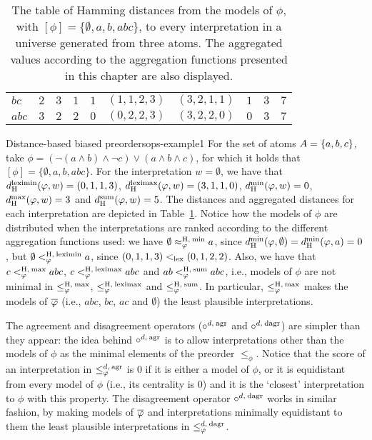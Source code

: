 \begin{table}
\begin{tabular}{lccccccccc}
	$bc$								& 
	$2$									&
	$3$									& 
	$1$									& 
	$1$									& 
	$(1,1,2,3)$							&
	$(3,2,1,1)$							&	
	$1$									&
	$3$									& 
	$7$									\\
	
	$abc$								& 
	$3$									&
	$2$									& 
	$2$									& 
	$0$									& 
	$(0,2,2,3)$							&
	$(3,2,2,0)$							&
	$0$									&
	$3$									& 
	$7$									\\\bottomrule
\end{tabular}
\caption{
	The table of Hamming distances from the models of 
	$\phi$, with $[\phi]=\{\emptyset,a,b,abc\}$,
	to every interpretation in a universe generated from three atoms.
	The aggregated values according to the aggregation functions presented in this chapter
	are also displayed.
}
\label{table:distances-example}
\end{table}


\begin{xmpl}{Distance-based biased preorders}{ops-example1}
	For the set of atoms $A=\{a,b,c\}$,
	take $\phi=(\lnot(a\land b)\land\lnot c)\lor (a\land b\land c)$,
	for which it holds that $[\phi]=\{\emptyset,a,b,abc\}$.
	For the interpretation $w=\emptyset$,
	we have that 
	$d^{\operatorname{leximin}}_{\operatorname{H}}(\varphi,w)=(0,1,1,3)$,
	$d^{\operatorname{leximax}}_{\operatorname{H}}(\varphi,w)=(3,1,1,0)$,
	$d^{\operatorname{min}}_{\operatorname{H}}(\varphi,w)=0$,
	$d^{\operatorname{max}}_{\operatorname{H}}(\varphi,w)=3$ and
	$d^{\operatorname{sum}}_{\operatorname{H}}(\varphi,w)=5$.
	The distances and aggregated distances for each
	interpretation are depicted in Table~\ref{table:distances-example}.
	Notice how the models of $\phi$
	are distributed when the interpretations are ranked according
	to the different aggregation functions used:
	we have $\emptyset\approx^{{\operatorname{H}},\:{\operatorname{min}}}_\varphi a$,
	since $d^{\operatorname{min}}_{\operatorname{H}}(\varphi,\emptyset)=d^{\operatorname{min}}_{\operatorname{H}}(\varphi,a)=0$,
	but $\emptyset<_\varphi^{{\operatorname{H}},\:{\operatorname{leximin}}} a$,
	since $(0,1,1,3)<_{\operatorname{lex}}(0,1,2,2)$.
	Also, we have that $c<_\varphi^{{\operatorname{H}},\:{\operatorname{max}}}abc$,
	$c<_\varphi^{{\operatorname{H}},\:{\operatorname{leximax}}}abc$
	and $ab<_\varphi^{{\operatorname{H}},\:{\operatorname{sum}}}abc$, i.e.,
	models of $\phi$ are not minimal in $\le_\varphi^{{\operatorname{H}},\:{\operatorname{max}}}$,
	$\le_\varphi^{{\operatorname{H}},\:{\operatorname{leximax}}}$ and $\le_\varphi^{{\operatorname{H}},\:{\operatorname{sum}}}$.
	In particular, $\le_\varphi^{{\operatorname{H}},\:{\operatorname{max}}}$ makes the models of $\overline{\varphi}$
	(i.e., $abc$, $bc$, $ac$ and $\emptyset$)
	the least plausible interpretations. 	
\end{xmpl}

The agreement and disagreement operators 
($\circ^{d,\:\mathrm{agr}}$ and $\circ^{d,\:\mathrm{dagr}}$)
are simpler than they appear:
the idea behind $\circ^{d,\:\mathrm{agr}}$ is to allow
interpretations other than the models of $\phi$
as the minimal elements of the preorder $\le_\phi$.
Notice that the score of an interpretation in $\le_\varphi^{d,\:\mathrm{agr}}$
is $0$ if it is either a model of $\phi$,
or it is equidistant from every model of $\phi$
(i.e., its centrality is $0$) and it is the `closest'
interpretation to $\phi$ with this property. 
The disagreement operator $\circ^{d,\:\mathrm{dagr}}$ works in similar fashion,
by making models of $\overline{\varphi}$ and interpretations minimally equidistant to them 
the least plausible interpretations in $\le_\varphi^{d,\:\mathrm{dagr}}$.

